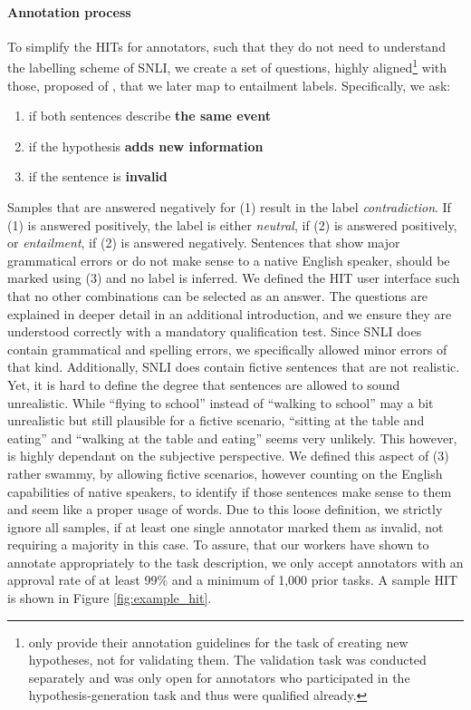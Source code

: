 \paragraph*{Annotation process}
To simplify the \ac{HIT}s for annotators, such that they do not need to understand the labelling scheme of \ac{SNLI}, we create a set of questions, highly aligned\footnote{\cite{bowman2015large} only provide their annotation guidelines for the task of creating new hypotheses, not for validating them. The validation task was conducted separately and was only open for annotators who participated in the hypothesis-generation task and thus were qualified already. } with those, proposed of \cite{bowman2015large}, that we later map to entailment labels. Specifically, we ask:
\begin{enumerate}
\item if both sentences describe \textbf{the same event}
\item if the hypothesis \textbf{adds new information}
\item if the sentence is \textbf{invalid}
\end{enumerate}
Samples that are answered negatively for (1) result in the label \textit{contradiction}. If (1) is answered positively, the label is either \textit{neutral}, if (2) is answered positively, or \textit{entailment}, if (2) is answered negatively. Sentences that show major grammatical errors or do not make sense to a native English speaker, should be marked using (3) and no label is inferred. We defined the \ac{HIT} user interface such that no other combinations can be selected as an answer. The questions are explained in deeper detail in an additional introduction, and we ensure they are understood correctly with a mandatory qualification test. Since \ac{SNLI} does contain grammatical and spelling errors, we specifically allowed minor errors of that kind. Additionally, \ac{SNLI} does contain fictive sentences that are not realistic. Yet, it is hard to define the degree that sentences are allowed to sound unrealistic. While ``flying to school'' instead of ``walking to school'' may a bit unrealistic but still plausible for a fictive scenario, ``sitting at the table and eating'' and ``walking at the table and eating'' seems very unlikely. This however, is highly dependant on the subjective perspective. We defined this aspect of (3) rather swammy, by allowing fictive scenarios, however counting on the English capabilities of native speakers, to identify if those sentences make sense to them and seem like a proper usage of words. Due to this loose definition, we strictly ignore all samples, if at least one single annotator marked them as invalid, not requiring a majority in this case. To assure, that our workers have shown to annotate appropriately to the task description, we only accept annotators with an approval rate of at least 99\% and a minimum of 1,000 prior tasks. A sample \ac{HIT} is shown in Figure \ref{fig:example_hit}. 
